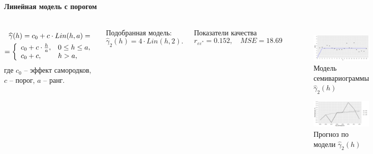 \documentclass[notheorems]{beamer}
\theoremstyle{definition}
\theoremstyle{example}
\theoremstyle{plain}
\begin{document}
\begin{frame}
  \frametitle{\large\subsecname}
  \framesubtitle{Линейная модель с порогом}
  \begin{columns}[c]
  {\footnotesize
  \begin{equation}\begin{gathered}
  \label{eq:linsill}
    \widehat{\gamma}(h) = c_0 + c \cdot Lin(h, a) = \\
    = \left\{
    \begin{array}{l l}
     c_0 + c \cdot \frac{h}{a}, & 0 \leq h \leq a, \\
     c_0 + c, & h > a,
    \end{array} \right.
  \end{gathered}\end{equation}
  где $ c_0 $ -- эффект самородков, $ c $ -- порог, $ a $ -- ранг.

  \vspace{0.5em}

  Подобранная модель:
  \begin{equation}
  \label{eq:gamma4}
    \widehat{\gamma}_2(h) = 4 \cdot Lin(h, 2).
  \end{equation}

  Показатели качества
  \begin{equation*}
    r_{\varepsilon\varepsilon^{*}} = 0.152, \quad MSE = 18.69
  \end{equation*}
  }

  \vspace{-14.5pt}
  \begin{figure}[H]
    \includegraphics[width=0.9\linewidth]{../../figures/variogram/lin-fit-adapt-modeled.png} \\
    \caption{Модель семивариограммы $\widehat{\gamma}_2(h)$}
    \includegraphics[width=0.9\linewidth]{../../figures/variogram/lin-fit-adapt-cross-prediction.png}
    \caption{Прогноз по модели $\widehat{\gamma}_2(h)$}
  \end{figure}
  \end{columns}
\end{frame}
\end{document}
